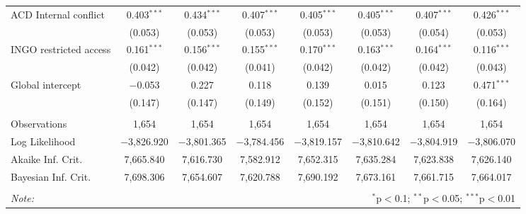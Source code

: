 \begin{sidewaystable}[!htbp]
\begin{tabular}{@{\extracolsep{5pt}}lccccccc}
  ACD Internal conflict & 0.403$^{***}$ & 0.434$^{***}$ & 0.407$^{***}$ & 0.405$^{***}$ & 0.405$^{***}$ & 0.407$^{***}$ & 0.426$^{***}$ \\ 
  & (0.053) & (0.053) & (0.053) & (0.053) & (0.053) & (0.054) & (0.053) \\ 
  INGO restricted access & 0.161$^{***}$ & 0.156$^{***}$ & 0.155$^{***}$ & 0.170$^{***}$ & 0.163$^{***}$ & 0.164$^{***}$ & 0.116$^{***}$ \\ 
  & (0.042) & (0.042) & (0.041) & (0.042) & (0.042) & (0.042) & (0.043) \\ 
  Global intercept & $-$0.053 & 0.227 & 0.118 & 0.139 & 0.015 & 0.123 & 0.471$^{***}$ \\ 
  & (0.147) & (0.147) & (0.149) & (0.152) & (0.151) & (0.150) & (0.164) \\ 
 \hline \\[-1.8ex] 
Observations & 1,654 & 1,654 & 1,654 & 1,654 & 1,654 & 1,654 & 1,654 \\ 
Log Likelihood & $-$3,826.920 & $-$3,801.365 & $-$3,784.456 & $-$3,819.157 & $-$3,810.642 & $-$3,804.919 & $-$3,806.070 \\ 
Akaike Inf. Crit. & 7,665.840 & 7,616.730 & 7,582.912 & 7,652.315 & 7,635.284 & 7,623.838 & 7,626.140 \\ 
Bayesian Inf. Crit. & 7,698.306 & 7,654.607 & 7,620.788 & 7,690.192 & 7,673.161 & 7,661.715 & 7,664.017 \\ 
\hline 
\hline \\[-1.8ex] 
\textit{Note:}  & \multicolumn{7}{r}{$^{*}$p$<$0.1; $^{**}$p$<$0.05; $^{***}$p$<$0.01} \\ 
\end{tabular} 
\end{sidewaystable} 
